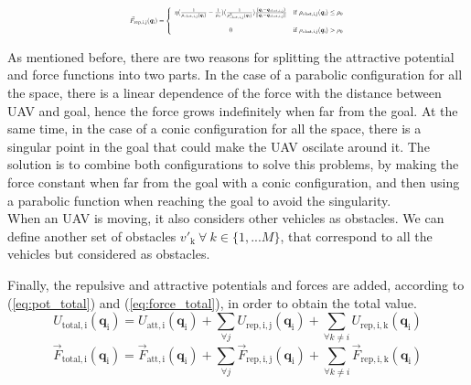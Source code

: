 \documentclass[journal]{IEEEtran}
\newcommand*{\subb}[1]{_{\mathrm{#1}}}
\begin{document}
	\begin{equation} \label{eq:force_rep}	
		\resizebox{0.5\textwidth}{!}{ $
		\vec{F}\subb{rep, i,j}(\bm{q}\subb{i}) =  \left\lbrace  {\begin{array}{cc}
		\eta (\frac{1}{\rho\subb{obst,i,j}(\bm{q}\subb{i})}-\frac{1}{\rho\subb{0}})(\frac{1}{\rho\subb{obst,i,j}^2(\bm{q}\subb{i})})\frac{(\bm{q}\subb{i}-\bm{q}\subb{obst,i,j})}{\parallel\bm{q}\subb{i}-\bm{q}\subb{obst,i,j}\parallel} & \textrm{if} \ \rho\subb{obst,i,j}(\bm{q}\subb{i})\leq \rho\subb{0} \\
		\\
		0 &\textrm{if} \ \rho\subb{obst,i,j}(\bm{q}\subb{i})> \rho\subb{0} \\
		\end{array} } \right. $}
	\end{equation}
	
	As mentioned before, there are two reasons for splitting the attractive potential and force functions into two parts. In the case of a parabolic configuration for all the space, there is a linear dependence of the force with the distance between UAV and goal, hence the force grows indefinitely when far from the goal. At the same time, in the case of a conic configuration for all the space, there is a singular point in the goal that could make the UAV oscilate around it. The solution is to combine both configurations to solve this problems, by making the force constant when far from the goal with a conic configuration, and then using a parabolic function when reaching the goal to avoid the singularity.\\
	
	When an UAV is moving, it also considers other vehicles as obstacles. We can define another set of obstacles $v'\subb{k} \ \forall \ k \in \{1, ...M\}$, that correspond to all the vehicles but considered as obstacles.

	Finally, the repulsive and attractive potentials and forces are added, according to (\ref{eq:pot_total}) and (\ref{eq:force_total}), in order to obtain the total value. 
	\begin{equation} \label{eq:pot_total}
	U\subb{total, i}(\bm{q}\subb{i}) = U\subb{att, i}(\bm{q}\subb{i}) + \sum \limits_{\forall j}U\subb{rep,i,j}(\bm{q}\subb{i}) + \sum \limits_{\forall k \neq i}U\subb{rep,i,k}(\bm{q}\subb{i}) 
	\end{equation}
	\begin{equation} \label{eq:force_total}
	\vec{F}\subb{total, i}(\bm{q}\subb{i}) = \vec{F}\subb{att,i}(\bm{q}\subb{i}) + \sum\limits_{\forall j} \vec{F}\subb{rep,i,j}(\bm{q}\subb{i}) + \sum\limits_{\forall k \neq i} \vec{F}\subb{rep,i,k}(\bm{q}\subb{i})
	\end{equation}
	
\end{document}
